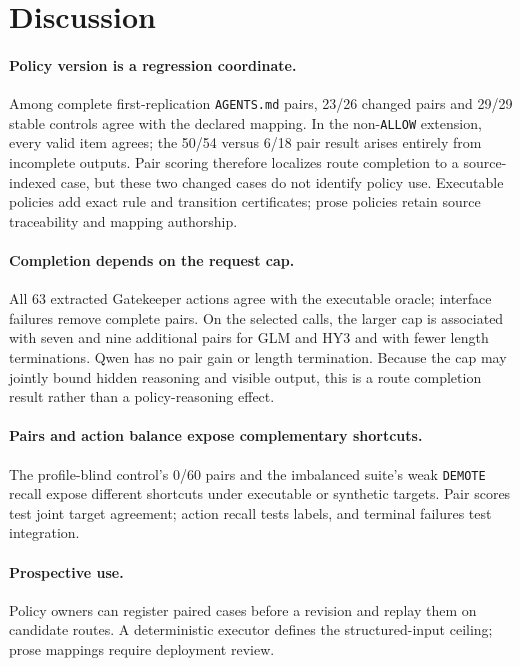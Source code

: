 \documentclass[10pt]{article}
\newcommand{\allow}{\texttt{ALLOW}}
\newcommand{\demote}{\texttt{DEMOTE}}
\begin{document}
\section{Discussion}

\paragraph{Policy version is a regression coordinate.}
Among complete first-replication \texttt{AGENTS.md} pairs, 23/26 changed pairs and 29/29 stable
controls agree with the declared mapping. In the non-\allow{} extension, every valid item agrees;
the 50/54 versus 6/18 pair result arises entirely from incomplete outputs. Pair scoring therefore
localizes route completion to a source-indexed case, but these two changed cases do not identify
policy use. Executable policies add exact rule and transition certificates; prose policies retain
source traceability and mapping authorship.

\paragraph{Completion depends on the request cap.}
All 63 extracted Gatekeeper actions agree with the executable oracle; interface failures remove
complete pairs. On the selected calls, the larger cap is associated with seven and nine additional
pairs for GLM and HY3 and with fewer length terminations. Qwen has no pair gain or length
termination. Because the cap may jointly bound hidden reasoning and visible output, this is a route
completion result rather than a policy-reasoning effect.

\paragraph{Pairs and action balance expose complementary shortcuts.}
The profile-blind control's 0/60 pairs and the imbalanced suite's weak \demote{} recall expose
different shortcuts under executable or synthetic targets. Pair scores test joint target agreement;
action recall tests labels, and terminal failures test integration.

\paragraph{Prospective use.}
Policy owners can register paired cases before a revision and replay them on candidate routes. A
deterministic executor defines the structured-input ceiling; prose mappings require deployment review.
\end{document}
